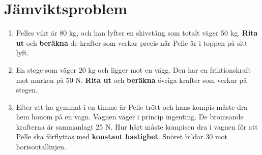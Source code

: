 \documentclass[11pt]{article}
\begin{document}
\raggedright
\setcounter{section}{1}
\section{Jämviktsproblem}

\begin{enumerate}[itemsep=2em]
        \item
              \begin{minipage}[t]{0.6\textwidth}
                      Pelles vikt är 80 kg, och han lyfter en skivstång som totalt väger 50 kg. \textbf{Rita ut} och \textbf{beräkna} de krafter som verkar precis när Pelle är i toppen på sitt lyft.
              \end{minipage}
              \hspace{2em}
              \begin{adjustbox}{valign=t}
                      
              \end{adjustbox}
        \item
              \begin{minipage}[t]{0.6\textwidth}
                      En stege som väger 20 kg och ligger mot en vägg. Den har en friktionskraft mot marken på 50 N. \textbf{Rita ut} och \textbf{beräkna} övriga krafter som verkar på stegen.
              \end{minipage}
              \hspace{2em}
              \begin{adjustbox}{valign=t}
                      
              \end{adjustbox}
        \item
              \begin{minipage}[t]{0.4\textwidth}
                      \raggedright
                      Efter att ha gymmat i en timme är Pelle trött och hans kompis måste dra hem honom på en vagn. Vagnen väger i princip ingenting. De bromsande krafterna är sammanlagt 25 N. Hur hårt måste kompisen dra i vagnen för att Pelle ska förflyttas med \textbf{konstant hastighet}. Snöret bildar 30\degree{} mot horisontallinjen.
              \end{minipage}
              \hspace{1em}
              \begin{adjustbox}{valign=t}
                      
              \end{adjustbox}
\end{enumerate}
\end{document}
